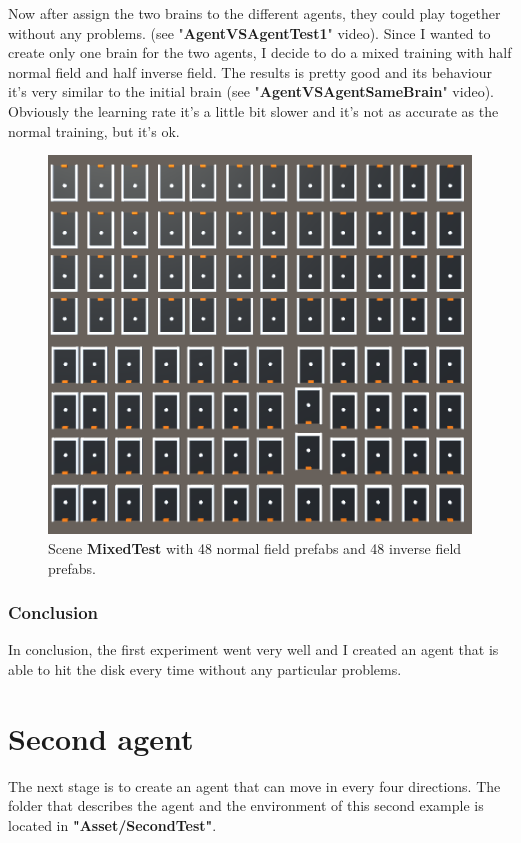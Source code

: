\documentclass[12pt]{article}
\begin{document}
	\noindent
	Now after assign the two brains to the different agents, they could play together without any problems. (see "\textbf{AgentVSAgentTest1}" video).
	Since I wanted to create only one brain for the two agents, I decide to do a mixed training with half normal field and half inverse field. The results is pretty good and its behaviour it's very similar to the initial brain (see "\textbf{AgentVSAgentSameBrain}" video). Obviously the learning rate it's a little bit slower and it's not as accurate as the normal training, but it's ok.
	
	\newpage
	
	\begin{figure}[hbt!]
		\centering
		\includegraphics[width= 0.76
		\textwidth]{images/MixedField.png}
		\caption{Scene \textbf{MixedTest} with 48 normal field prefabs and 48 inverse field prefabs.}
	\end{figure}

	\subsubsection{Conclusion}
	In conclusion, the first experiment went very well and I created an agent that is able to hit the disk every time without any particular problems.
	
	\newpage
	
	\section{Second agent}
	
	The next stage is to create an agent that can move in every four directions. The folder that describes the agent and the environment of this second example is located in \textbf{"Asset/SecondTest"}.
	
\end{document}
